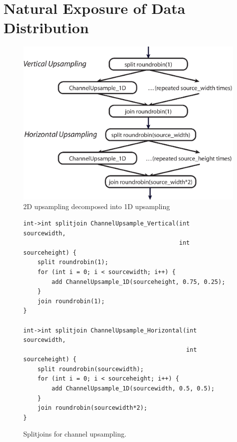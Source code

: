 \section{Natural Exposure of Data Distribution}
\label{sec:expose_data}

\begin{figure}
  \begin{center}
    \includegraphics[scale=0.6, angle=0]{./channel_upsampling.eps}
    \caption{2D upsampling decomposed into 1D upsampling}
    \label{fig:how-upsampler-splits-data}
  \end{center}
\end{figure}

\begin{figure}
  \begin{center}
    \begin{minipage}{5.2in}
      \begin{small}
        \begin{verbatim}
int->int splitjoin ChannelUpsample_Vertical(int sourcewidth, 
                                            int sourceheight) {
    split roundrobin(1);
    for (int i = 0; i < sourcewidth; i++) {
        add ChannelUpsample_1D(sourceheight, 0.75, 0.25);
    }
    join roundrobin(1);
}

int->int splitjoin ChannelUpsample_Horizontal(int sourcewidth, 
                                              int sourceheight) {
    split roundrobin(sourcewidth);
    for (int i = 0; i < sourceheight; i++) {
        add ChannelUpsample_1D(sourcewidth, 0.5, 0.5);
    }
    join roundrobin(sourcewidth*2);
}
        \end{verbatim}
      \end{small}
    \end{minipage}
  \end{center}
  \caption{Splitjoins for channel upsampling.}
  \label{fig:upsamplecode}
\end{figure}

